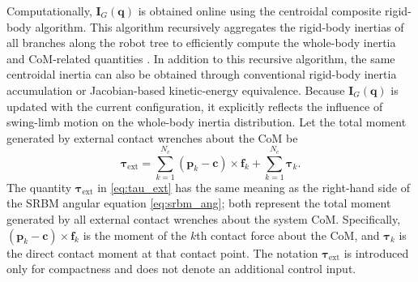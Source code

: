 \documentclass[5p,times]{elsarticle}
\begin{document}
Computationally, $\bm I_G(\bm q)$ is obtained online using the centroidal composite rigid-body algorithm. This algorithm recursively aggregates the rigid-body inertias of all branches along the robot tree to efficiently compute the whole-body inertia and CoM-related quantities \cite{ref44,ref80}. In addition to this recursive algorithm, the same centroidal inertia can also be obtained through conventional rigid-body inertia accumulation or Jacobian-based kinetic-energy equivalence. Because $\bm I_G(\bm q)$ is updated with the current configuration, it explicitly reflects the influence of swing-limb motion on the whole-body inertia distribution. Let the total moment generated by external contact wrenches about the CoM be
\begin{equation}
\bm\tau_{\text{ext}}
=\sum_{k=1}^{N_c}(\bm p_k-\bm c)\times \bm f_k+\sum_{k=1}^{N_c}\bm\tau_k .
\label{eq:tau_ext}
\end{equation}
The quantity $\bm\tau_{\text{ext}}$ in \eqref{eq:tau_ext} has the same meaning as the right-hand side of the SRBM angular equation \eqref{eq:srbm_ang}; both represent the total moment generated by all external contact wrenches about the system CoM. Specifically, $(\bm p_k-\bm c)\times \bm f_k$ is the moment of the $k$th contact force about the CoM, and $\bm\tau_k$ is the direct contact moment at that contact point. The notation $\bm\tau_{\text{ext}}$ is introduced only for compactness and does not denote an additional control input.
\end{document}
